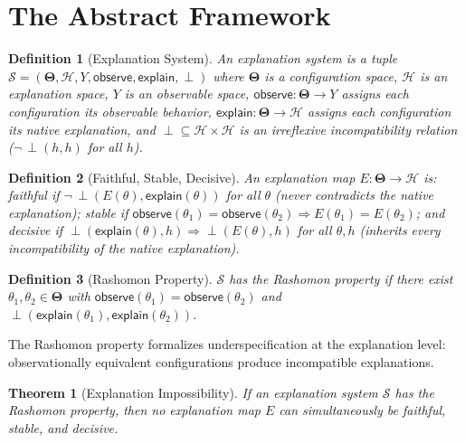 \documentclass{article}
\newtheorem{theorem}{Theorem}
\newtheorem{definition}{Definition}
\newcommand{\Params}{\mathbf{\Theta}}
\newcommand{\sH}{\mathcal{H}}
\newcommand{\incomp}{\perp}
\begin{document}
\section{The Abstract Framework}
\label{sec:framework}

\begin{definition}[Explanation System]
\label{def:explanation-system}
An \emph{explanation system} is a tuple $\mathcal{S} = (\Params, \sH, Y, \mathsf{observe}, \mathsf{explain}, \incomp)$ where
$\Params$ is a configuration space,
$\sH$ is an explanation space,
$Y$ is an observable space,
$\mathsf{observe}: \Params \to Y$ assigns each configuration its observable behavior,
$\mathsf{explain}: \Params \to \sH$ assigns each configuration its native explanation, and
$\incomp \subseteq \sH \times \sH$ is an irreflexive incompatibility relation
($\neg\,\incomp(h,h)$ for all $h$).
\end{definition}

\begin{definition}[Faithful, Stable, Decisive]
\label{def:three}
An explanation map $E : \Params \to \sH$ is:
\emph{faithful} if $\neg\,\incomp(E(\theta), \mathsf{explain}(\theta))$ for all $\theta$
(never contradicts the native explanation);
\emph{stable} if $\mathsf{observe}(\theta_1) = \mathsf{observe}(\theta_2) \Rightarrow E(\theta_1) = E(\theta_2)$;
and \emph{decisive} if $\incomp(\mathsf{explain}(\theta), h) \Rightarrow \incomp(E(\theta), h)$ for all $\theta, h$
(inherits every incompatibility of the native explanation).
\end{definition}

\begin{definition}[Rashomon Property]
\label{def:rashomon}
$\mathcal{S}$ has the \emph{Rashomon property} if there exist $\theta_1, \theta_2 \in \Params$ with
$\mathsf{observe}(\theta_1) = \mathsf{observe}(\theta_2)$ and
$\incomp(\mathsf{explain}(\theta_1), \mathsf{explain}(\theta_2))$.
\end{definition}

The Rashomon property formalizes underspecification at the explanation level: observationally equivalent configurations produce incompatible explanations.

\begin{theorem}[Explanation Impossibility]
\label{thm:universal}
If an explanation system $\mathcal{S}$ has the Rashomon property, then no explanation map $E$ can simultaneously be faithful, stable, and decisive.
\end{theorem}
\end{document}
